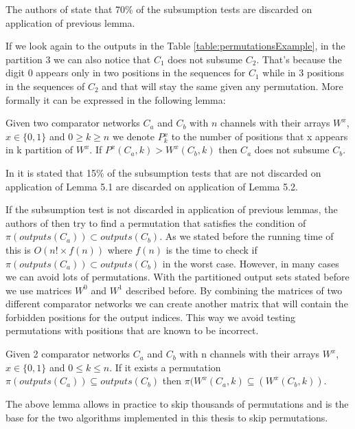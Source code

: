 \documentclass[../main.tex]{subfiles}
\begin{document}
	The authors of \cite{sortingnineinputs} state that 70\% of the subsumption tests are discarded on application of previous lemma.
	
	If we look again to the outputs in the Table \ref{table:permutationsExample}, in the partition 3 we can also notice that $C_1$ does not subsume $C_2$. That's because the digit 0 appears only in two positions in the sequences for $C_1$ while in 3 positions in the sequences of $C_2$ and that will stay the same given any permutation. More formally it can be expressed in the following lemma:
	
	\begin{lemma}\label{lemmaSubsume2}
		Given two comparator networks $C_a$ and $C_b$ with $n$ channels with their arrays $W^x$, $x \in \{0,1\}$ and $0\geq k \geq n$ we denote $P{^x_k}$ to the number of positions that x appears in k partition of $W^x$. If $P^x(C_a, k) > W^x(C_b, k)$ then $C_a$ does not subsume $C_b$.
	\end{lemma}
	
	In \cite{sortingnineinputs} it is stated that 15\% of the subsumption tests that are not discarded on application of Lemma 5.1 are discarded on application of Lemma 5.2.
	
	If the subsumption test is not discarded in application of previous lemmas, the authors of \cite{sortingnineinputs} then try to find a permutation that satisfies the condition of $\pi(outputs(C_a)) \subset outputs(C_b)$. As we stated before the running time of this is $O(n! \times f(n))$ where $f(n)$ is the time to check if $\pi(outputs(C_a)) \subset outputs(C_b)$ in the worst case. However, in many cases we can avoid lots of permutations. With the partitioned output sets stated before we use matrices $W^0$ and $W^1$ described before. By combining the matrices of two different comparator networks we can create another matrix that will contain the forbidden positions for the output indices. This way we avoid testing permutations with positions that are known to be incorrect.
	
	\begin{lemma} \label{skipPermuationsLemma}
		Given 2 comparator networks $C_a$ and $C_b$ with n channels with their arrays $W^x$, $x \in \{0,1\}$ and $0 \leq k \leq n$. If it exists a permutation $\pi(outputs(C_a)) \subseteq outputs(C_b)$ then $\pi(W^x(C_a, k) \subseteq (W^x(C_b, k))$.
	\end{lemma}
	
	The above lemma allows in practice to skip thousands of permutations and is the base for the two algorithms implemented in this thesis to skip permutations.
	\newpage
\end{document}
